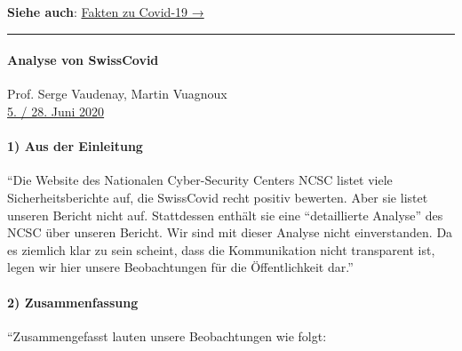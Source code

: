 \textbf{Siehe auch}:
\href{https://swprs.org/covid-19-hinweis-ii/}{Fakten zu Covid-19 →}

\begin{center}\rule{0.5\linewidth}{\linethickness}\end{center}

\hypertarget{analyse-von-swisscovid}{%
\paragraph{Analyse von SwissCovid}\label{analyse-von-swisscovid}}

Prof. Serge Vaudenay, Martin Vuagnoux\\
\href{https://lasec.epfl.ch/people/vaudenay/swisscovid.html}{5. / 28.
Juni 2020}

\hypertarget{1-aus-der-einleitung}{%
\paragraph{1) Aus der Einleitung}\label{1-aus-der-einleitung}}

``Die Website des Nationalen Cyber-Security Centers NCSC listet viele
Sicherheits­­berichte auf, die SwissCovid recht positiv bewerten. Aber
sie listet unseren Bericht nicht auf. Stattdessen enthält sie eine
``detaillierte Analyse'' des NCSC über unseren Bericht. Wir sind mit
dieser Analyse nicht einverstanden. Da es ziemlich klar zu sein scheint,
dass die Kommunikation nicht transparent ist, legen wir hier unsere
Beobachtungen für die Öffentlichkeit dar.''

\hypertarget{2-zusammenfassung}{%
\paragraph{2) Zusammenfassung}\label{2-zusammenfassung}}

``Zusammengefasst lauten unsere Beobachtungen wie folgt:

